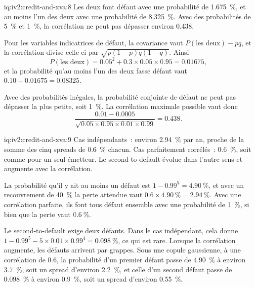 \begin{solution}{iq:iv2:credit-and-xva:8}
Les deux font défaut avec une probabilité de 1.675~\%, et au moins l'un des deux avec une probabilité de 8.325~\%. Avec des probabilités de 5~\% et 1~\%, la corrélation ne peut pas dépasser environ 0.438.

Pour les variables indicatrices de défaut, la covariance vaut $P(\text{les deux}) - pq$, et la corrélation divise celle-ci par $\sqrt{p(1 - p)q(1 - q)}$. Ainsi
\[
P(\text{les deux}) = 0.05^2 + 0.3 \times 0.05 \times 0.95 = 0.01675,
\]
et la probabilité qu'au moins l'un des deux fasse défaut vaut $0.10 - 0.01675 = 0.08325$.

Avec des probabilités inégales, la probabilité conjointe de défaut ne peut pas dépasser la plus petite, soit 1~\%. La corrélation maximale possible vaut donc
\[
\frac{0.01 - 0.0005}{\sqrt{0.05 \times 0.95 \times 0.01 \times 0.99}} = 0.438.
\]

\end{solution}

\begin{solution}{iq:iv2:credit-and-xva:9}
Cas indépendants~: environ 2.94~\% par an, proche de la somme des cinq spreads de 0.6~\% chacun. Cas parfaitement corrélés~: 0.6~\%, soit comme pour un seul émetteur. Le second-to-default évolue dans l'autre sens et augmente avec la corrélation.

La probabilité qu'il y ait au moins un défaut est $1 - 0.99^5 = 4.90~\%$, et avec un recouvrement de 40~\% la perte attendue vaut $0.6 \times 4.90~\% = 2.94~\%$. Avec une corrélation parfaite, ils font tous défaut ensemble avec une probabilité de 1~\%, si bien que la perte vaut $0.6~\%$.

Le second-to-default exige deux défauts. Dans le cas indépendant, cela donne $1 - 0.99^5 - 5 \times 0.01 \times 0.99^4 = 0.098~\%$, ce qui est rare. Lorsque la corrélation augmente, les défauts arrivent par grappes. Sous une copule gaussienne, à une corrélation de 0.6, la probabilité d'un premier défaut passe de 4.90~\% à environ 3.7~\%, soit un spread d'environ 2.2~\%, et celle d'un second défaut passe de 0.098~\% à environ 0.9~\%, soit un spread d'environ 0.55~\%.

\end{solution}

